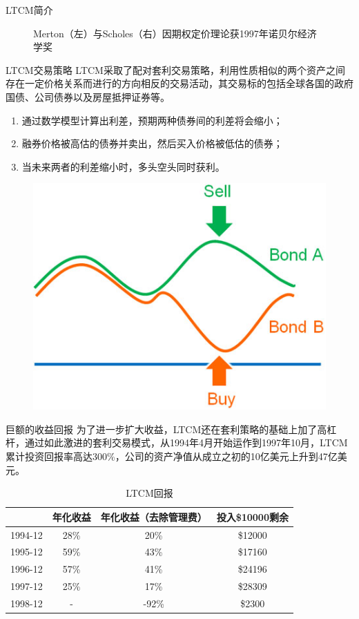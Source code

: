 \begin{frame}{LTCM简介}
\begin{figure}
\begin{minipage}{0.48\linewidth}
        \end{minipage}
        \caption{Merton（左）与Scholes（右）因期权定价理论获1997年诺贝尔经济学奖}
    \end{figure}
\end{frame}

\begin{frame}{LTCM交易策略}
    LTCM采取了配对套利交易策略，利用性质相似的两个资产之间存在一定价格关系而进行的方向相反的交易活动，其交易标的包括全球各国的政府国债、公司债券以及房屋抵押证券等。
    \begin{enumerate}
        \item 通过数学模型计算出利差，预期两种债券间的利差将会缩小；
        \item 融券价格被高估的债券并卖出，然后买入价格被低估的债券；
        \item 当未来两者的利差缩小时，多头空头同时获利。
    \end{enumerate}
    \begin{figure}
        \centering
        \includegraphics[width=0.5\linewidth]{img/ltcm.jpg}
    \end{figure}
\end{frame}

\begin{frame}{巨额的收益回报}
    为了进一步扩大收益，LTCM还在套利策略的基础上加了高杠杆，通过如此激进的套利交易模式，从1994年4月开始运作到1997年10月，LTCM累计投资回报率高达300\%，公司的资产净值从成立之初的10亿美元上升到47亿美元。
    \begin{table}
        \caption{LTCM回报}
        \begin{tabular}{|c|ccc|}
        \hline
                & 年化收益 & 年化收益（去除管理费） & 投入\$10000剩余 \\\hline
        1994-12 & 28\% & 20\%        & \$12000     \\
        1995-12 & 59\% & 43\%        & \$17160     \\
        1996-12 & 57\% & 41\%        & \$24196     \\
        1997-12 & 25\% & 17\%        & \$28309     \\
        1998-12 & -    & -92\%       & \$2300     \\\hline
        \end{tabular}
    \end{table}
\end{frame}

